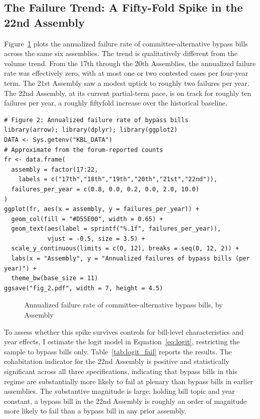 \documentclass[11pt]{article}
\begin{document}
\subsection{The Failure Trend: A Fifty-Fold Spike in the 22nd Assembly}

Figure~\ref{fig:fail_trend} plots the annualized failure rate of committee-alternative bypass bills across the same six assemblies. The trend is qualitatively different from the volume trend. From the 17th through the 20th Assemblies, the annualized failure rate was effectively zero, with at most one or two contested cases per four-year term. The 21st Assembly saw a modest uptick to roughly two failures per year. The 22nd Assembly, at its current partial-term pace, is on track for roughly ten failures per year, a roughly fiftyfold increase over the historical baseline.

\begin{verbatim}
# Figure 2: Annualized failure rate of bypass bills
library(arrow); library(dplyr); library(ggplot2)
DATA <- Sys.getenv("KBL_DATA")
# Approximate from the forum-reported counts
fr <- data.frame(
  assembly = factor(17:22,
    labels = c("17th","18th","19th","20th","21st","22nd")),
  failures_per_year = c(0.8, 0.0, 0.2, 0.0, 2.0, 10.0)
)
ggplot(fr, aes(x = assembly, y = failures_per_year)) +
  geom_col(fill = "#D55E00", width = 0.65) +
  geom_text(aes(label = sprintf("%.1f", failures_per_year)),
            vjust = -0.5, size = 3.5) +
  scale_y_continuous(limits = c(0, 12), breaks = seq(0, 12, 2)) +
  labs(x = "Assembly", y = "Annualized failures of bypass bills (per year)") +
  theme_bw(base_size = 11)
ggsave("fig_2.pdf", width = 7, height = 4.5)
\end{verbatim}

\begin{figure}[H]
\centering
{}
\caption{Annualized failure rate of committee-alternative bypass bills, by Assembly}
\label{fig:fail_trend}
\end{figure}

To assess whether this spike survives controls for bill-level characteristics and year effects, I estimate the logit model in Equation~\ref{eq:logit}, restricting the sample to bypass bills only. Table~\ref{tab:logit_fail} reports the results. The cohabitation indicator for the 22nd Assembly is positive and statistically significant across all three specifications, indicating that bypass bills in this regime are substantially more likely to fail at plenary than bypass bills in earlier assemblies. The substantive magnitude is large: holding bill topic and year constant, a bypass bill in the 22nd Assembly is roughly an order of magnitude more likely to fail than a bypass bill in any prior assembly.
\end{document}
